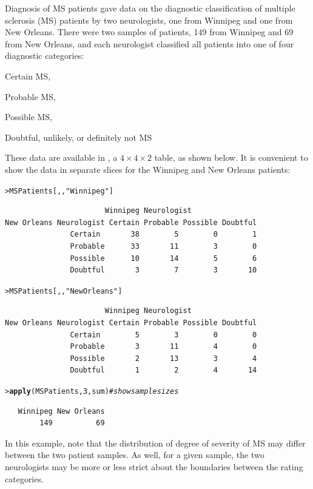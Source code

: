 \documentclass[10pt,krantz2]{krantz}\usepackage[]{graphicx}\usepackage[]{color}
\makeatletter
\newcommand{\hlnum}[1]{\textcolor[rgb]{0.686,0.059,0.569}{#1}}%
\newcommand{\hlstr}[1]{\textcolor[rgb]{0.192,0.494,0.8}{#1}}%
\newcommand{\hlcom}[1]{\textcolor[rgb]{0.678,0.584,0.686}{\textit{#1}}}%
\newcommand{\hlstd}[1]{\textcolor[rgb]{0.345,0.345,0.345}{#1}}%
\newcommand{\hlkwd}[1]{\textcolor[rgb]{0.737,0.353,0.396}{\textbf{#1}}}%
\newenvironment{kframe}{%
 \def\at@end@of@kframe{}%
 \ifinner\ifhmode%
  \def\at@end@of@kframe{\end{minipage}}%
  \begin{minipage}{\columnwidth}%
 \fi\fi%
 \def\FrameCommand##1{\hskip\@totalleftmargin \hskip-\fboxsep
 \colorbox{shadecolor}{##1}\hskip-\fboxsep
     \hskip-\linewidth \hskip-\@totalleftmargin \hskip\columnwidth}%
 \MakeFramed {\advance\hsize-\width
   \@totalleftmargin\z@ \linewidth\hsize
   \@setminipage}}%
 {\par\unskip\endMakeFramed%
 \at@end@of@kframe}
\newenvironment{knitrout}{}{} %
\renewenvironment{knitrout}{\small\renewcommand{\baselinestretch}{.85}}{} %
\makeatother
\begin{document}
\begin{Example}[MS1]{Diagnosis of MS patients}
\citet{LandisKoch:77} gave data on the diagnostic classification
of multiple sclerosis (MS) patients by two neurologists,
one from Winnipeg and one from New Orleans.
There were two samples of patients, 149 from Winnipeg and
69 from New Orleans, and each neurologist classified
all patients
into one of four diagnostic categories:
\begin{seriate}
\item Certain MS,
\item Probable MS,
\item Possible MS,
\item Doubtful, unlikely, or definitely not MS
\end{seriate}

These data are available in ,
a $4 \times 4 \times 2$ table, as shown below.
It is convenient to show the data in separate slices for the Winnipeg
and New Orleans patients:
\begin{knitrout}
\color{fgcolor}\begin{kframe}
\begin{alltt}
\hlstd{> }\hlstd{MSPatients[, ,} \hlstr{"Winnipeg"}\hlstd{]}
\end{alltt}
\begin{verbatim}
                       Winnipeg Neurologist
New Orleans Neurologist Certain Probable Possible Doubtful
               Certain       38        5        0        1
               Probable      33       11        3        0
               Possible      10       14        5        6
               Doubtful       3        7        3       10
\end{verbatim}
\begin{alltt}
\hlstd{> }\hlstd{MSPatients[, ,} \hlstr{"New Orleans"}\hlstd{]}
\end{alltt}
\begin{verbatim}
                       Winnipeg Neurologist
New Orleans Neurologist Certain Probable Possible Doubtful
               Certain        5        3        0        0
               Probable       3       11        4        0
               Possible       2       13        3        4
               Doubtful       1        2        4       14
\end{verbatim}
\begin{alltt}
\hlstd{> }\hlkwd{apply}\hlstd{(MSPatients,} \hlnum{3}\hlstd{, sum)}      \hlcom{# show sample sizes}
\end{alltt}
\begin{verbatim}
   Winnipeg New Orleans 
        149          69 
\end{verbatim}
\end{kframe}
\end{knitrout}
In this example, note that the distribution of degree of severity of
MS may differ between the two patient samples.  As well, for a
given sample, the two neurologists may be more or less strict about
the boundaries between the rating categories.


\end{Example}
\end{document}

